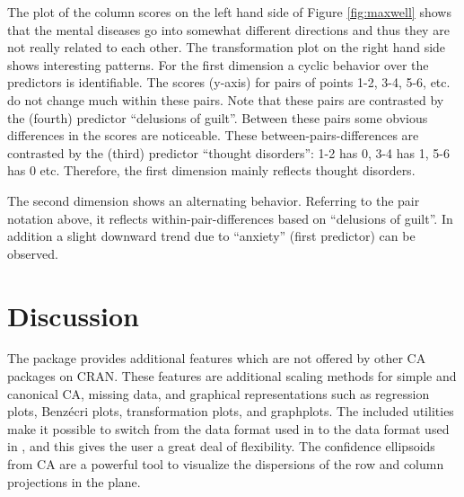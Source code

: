 \documentclass[article]{Z}
\begin{document}
The plot of the column scores on the left hand side of Figure \ref{fig:maxwell} shows that the mental diseases go into somewhat different directions and thus they are not really related to each other. The transformation plot on the right hand side shows interesting patterns. For the first dimension a cyclic behavior over the predictors is identifiable. The scores (y-axis) for pairs of points 1-2, 3-4, 5-6, etc. do not change much within these pairs. Note that these pairs are contrasted by the (fourth) predictor ``delusions of guilt''. Between these pairs some obvious differences in the scores are noticeable. These between-pairs-differences are contrasted by the (third) predictor ``thought disorders'': 1-2 has 0, 3-4 has 1, 5-6 has 0 etc. Therefore, the first dimension mainly reflects thought disorders. 

The second dimension shows an alternating behavior. Referring to the pair notation above, it reflects within-pair-differences based on ``delusions of guilt''. In addition a slight downward trend due to ``anxiety'' (first predictor) can be observed. 

\section{Discussion}
The  package provides additional features which are not offered by other CA packages on CRAN. These features are additional scaling methods for simple and canonical CA, missing data, and graphical representations such as regression plots, Benz\'ecri plots, transformation plots, and graphplots. The included utilities make it possible to switch from the data format used in  to the data format used in , and this gives the user a great deal of flexibility. The confidence ellipsoids from CA are a powerful tool to visualize the dispersions of the row and column projections in the plane. 



\end{document}
